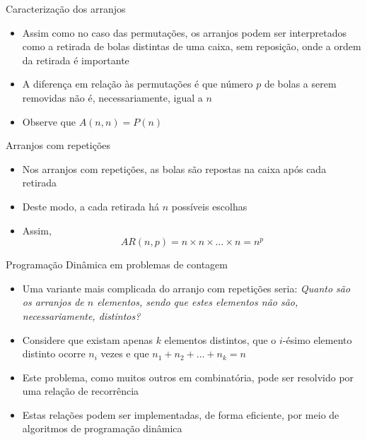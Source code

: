 \begin{frame}[fragile]{Caracterização dos arranjos}

    \begin{itemize}
        \item Assim como no caso das permutações, os arranjos podem ser interpretados como a
            retirada de bolas distintas de uma caixa, sem reposição, onde a ordem da retirada é
            importante

        \item A diferença em relação às permutações é que número $p$ de bolas a serem removidas não
            é, necessariamente, igual a $n$

        \item Observe que $A(n, n) = P(n)$
    \end{itemize}

\end{frame}

\begin{frame}[fragile]{Arranjos com repetições}

    \begin{itemize}
        \item Nos arranjos com repetições, as bolas são repostas na caixa após cada retirada 

        \item Deste modo, a cada retirada há $n$ possíveis escolhas

        \item Assim,
    $$
        AR(n, p) = n \times n \times \ldots \times n = n^p
    $$
    \end{itemize}

\end{frame}

\begin{frame}[fragile]{Programação Dinâmica em problemas de contagem}

    \begin{itemize}
        \item Uma variante mais complicada do arranjo com repetições seria: \textit{Quanto são os
            arranjos de $n$ elementos, sendo que estes elementos não são, necessariamente, distintos?}

        \item Considere que existam apenas $k$ elementos distintos, que o $i$-ésimo elemento 
            distinto ocorre $n_i$ vezes e que $n_1 + n_2 + \ldots + n_k = n$

        \item Este problema, como muitos outros em combinatória, pode ser resolvido por uma relação
           de recorrência

        \item Estas relações podem ser implementadas, de forma eficiente, por meio de algoritmos de
            programação dinâmica
    \end{itemize}

\end{frame}


